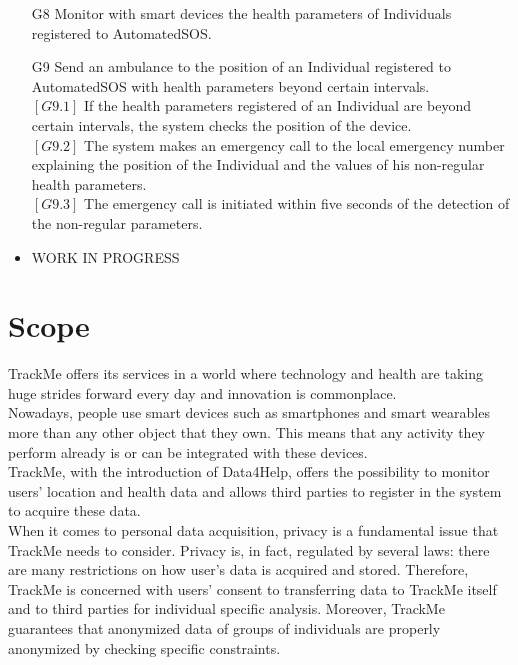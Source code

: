 \documentclass{report}
\begin{document}
\begin{itemize}
					\item[G8] Monitor with smart devices the health parameters of Individuals registered to AutomatedSOS.
					
					\item[G9] Send an ambulance to the position of an Individual registered to AutomatedSOS with health parameters beyond certain intervals.\\
					$\left[G9.1\right]$ If the health parameters registered of an Individual are beyond certain intervals, the system checks the position of the device.\\
					$\left[G9.2\right]$ The system makes an emergency call to the local emergency number explaining the position of the Individual and the values of his non-regular health parameters.\\
					$\left[G9.3\right]$ The emergency call is initiated within five seconds of the detection of the non-regular parameters.\\
				
					\item WORK IN PROGRESS
				\end{itemize}
			
		\section{Scope}
			TrackMe offers its services in a world where technology and health are taking huge strides forward every day and innovation is commonplace.\\
Nowadays, people use smart devices such as smartphones and smart wearables more than any other object that they own. This means that any activity they perform already is or can be integrated with these devices.\\
TrackMe, with the introduction of Data4Help, offers the possibility to monitor users’ location and health data and allows third parties to register in the system to acquire these data.\\
When it comes to personal data acquisition, privacy is a fundamental issue that TrackMe needs to consider. Privacy is, in fact, regulated by several laws: there are many restrictions on how user’s data is acquired and stored. Therefore, TrackMe is concerned with users’ consent to transferring data to TrackMe itself and to third parties for individual specific analysis. Moreover, TrackMe guarantees that anonymized data of groups of individuals are properly anonymized by checking specific constraints.\\
\end{document}
